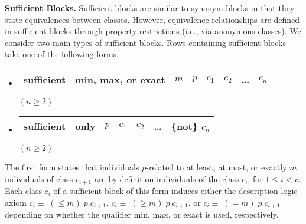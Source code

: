 \documentclass[preprint,number]{elsarticle}
\newcommand{\myblock}[1]{\vspace{12pt}\noindent\textbf{#1}}
\begin{document}
\myblock{Sufficient Blocks.} Sufficient blocks are similar to synonym
blocks in that they state equivalences between classes. However,
equivalence relationships are defined in sufficient blocks through
property restrictions (i.e., via anonymous classes). We consider two
main types of sufficient blocks. Rows containing sufficient blocks
take one of the following forms.
\begin{itemize}
\item[]
  \begin{tabular}{|l|l|l|l|l|l|l|l|}\hline 
    \textsf{sufficient} & \textsf{min}, \textsf{max}, or 
    \textsf{exact} & $m$ & $p$ & $c_1$ & $c_2$ & \dots & $c_n$\\ \hline
  \end{tabular} \hfill $(n \ge 2)$
\item[]
  \begin{tabular}{|l|l|l|l|l|l|l|}\hline 
    \textsf{sufficient} & \textsf{only} & $p$ & $c_1$ & $c_2$ & \dots & 
    \{\textsf{not}\} $c_n$\\ \hline
  \end{tabular} \hfill $(n \ge 2)$
\end{itemize}
The first form states that individuals $p$-related to at least, at
most, or exactly $m$ individuals of class $c_{i+1}$ are by definition
individuals of the class $c_i$, for $1 \le i < n$. Each class $c_i$ of
a sufficient block of this form induces either the description logic
axiom $c_i \equiv \; (\le m) \; p . c_{i+1}$, $c_i \equiv \; (\ge m)
\; p . c_{i+1}$, or $c_i \equiv \; (= m) \; p . c_{i+1}$ depending on
whether the qualifier \textsf{min}, \textsf{max}, or \textsf{exact} is
used, respectively.
\end{document}
